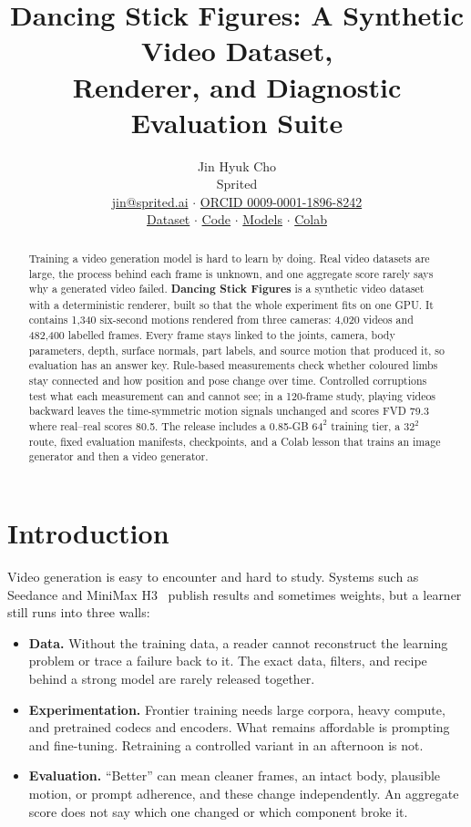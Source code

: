 \documentclass[10pt,twocolumn]{article}
\title{\vspace{-1.5em}\textbf{Dancing Stick Figures: A Synthetic Video Dataset,\\Renderer, and Diagnostic Evaluation Suite}}
\author{Jin Hyuk Cho\\Sprited\\\small\href{mailto:jin@sprited.ai}{jin@sprited.ai} $\cdot$
\href{https://orcid.org/0009-0001-1896-8242}{ORCID 0009-0001-1896-8242}\\[-2pt]
\small\href{https://huggingface.co/datasets/sprited/dancing-stick-figures}{Dataset} $\cdot$
\href{https://github.com/sprited-ai/dancing-stick-figures}{Code} $\cdot$
\href{https://huggingface.co/sprited/dancing-stick-figures-baselines}{Models} $\cdot$
\href{https://colab.research.google.com/github/sprited-ai/dancing-stick-figures/blob/main/notebooks/dancing_stick_figures_colab_v0_3.ipynb}{Colab}}
\date{}
\begin{document}
\raggedbottom\maketitle\vspace{-1.25em}
\begin{abstract}
Training a video generation model is hard to learn by doing. Real video datasets are large, the process behind
each frame is unknown, and one aggregate score rarely says why a generated video failed. \textbf{Dancing Stick
Figures} is a synthetic video dataset with a deterministic renderer, built so that the whole experiment fits on
one GPU. It contains 1,340 six-second motions rendered from three cameras: 4,020 videos and 482,400 labelled
frames. Every frame stays linked to the joints, camera, body parameters, depth, surface normals, part labels,
and source motion that produced it, so evaluation has an answer key. Rule-based measurements check whether
coloured limbs stay connected and how position and pose change over time. Controlled corruptions test what each
measurement can and cannot see; in a 120-frame study, playing videos backward leaves the time-symmetric motion
signals unchanged and scores FVD 79.3 where real--real scores 80.5. The release includes a 0.85-GB $64^2$
training tier, a $32^2$ route, fixed evaluation manifests, checkpoints, and a Colab lesson that trains an image
generator and then a video generator.
\end{abstract}

\section{Introduction}
Video generation is easy to encounter and hard to study. Systems such as Seedance and MiniMax
H3~\cite{gao2025seedance,minimax2026h3} publish results and sometimes weights, but a learner still runs into
three walls:
\begin{itemize}[leftmargin=*,nosep]
\item \textbf{Data.} Without the training data, a reader cannot reconstruct the learning problem or trace a
failure back to it. The exact data, filters, and recipe behind a strong model are rarely released together.
\item \textbf{Experimentation.} Frontier training needs large corpora, heavy compute, and pretrained codecs and
encoders. What remains affordable is prompting and fine-tuning. Retraining a controlled variant in an afternoon
is not.
\item \textbf{Evaluation.} ``Better'' can mean cleaner frames, an intact body, plausible motion, or prompt
adherence, and these change independently. An aggregate score does not say which one changed or which component
broke it.
\end{itemize}
\end{document}

